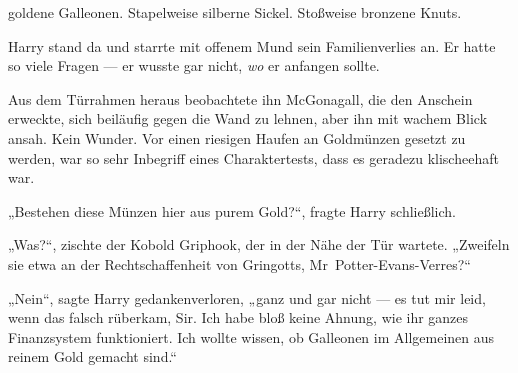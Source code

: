  goldene Galleonen. Stapelweise silberne Sickel. Stoßweise bronzene Knuts.

\hplettrineextrapara
Harry stand da und starrte mit offenem Mund sein Familienverlies an. Er hatte so viele Fragen — er wusste gar nicht, \emph{wo} er anfangen sollte.

Aus dem Türrahmen heraus beobachtete ihn McGonagall, die den Anschein erweckte, sich beiläufig gegen die Wand zu lehnen, aber ihn mit wachem Blick ansah. Kein Wunder. Vor einen riesigen Haufen an Goldmünzen gesetzt zu werden, war so sehr Inbegriff eines Charaktertests, dass es geradezu klischeehaft war.

„Bestehen diese Münzen hier aus purem Gold?“, fragte Harry schließlich.

„Was?“, zischte der Kobold Griphook, der in der Nähe der Tür wartete.
„Zweifeln sie etwa an der Rechtschaffenheit von Gringotts, Mr~Potter-Evans-Verres?“

„Nein“, sagte Harry gedankenverloren, „ganz und gar nicht — es tut mir leid, wenn das falsch rüberkam, Sir. Ich habe bloß keine Ahnung, wie ihr ganzes Finanzsystem funktioniert. Ich wollte wissen, ob Galleonen im Allgemeinen aus reinem Gold gemacht sind.“

